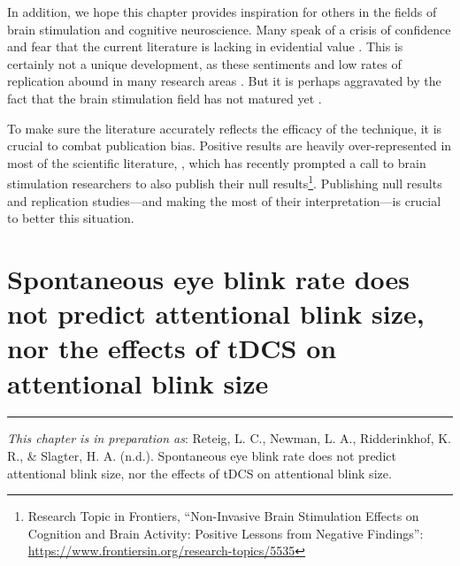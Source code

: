 \documentclass[11pt,]{memoir}
\let\rmarkdownfootnote\footnote%
\def\footnote{\protect\rmarkdownfootnote}
\begin{document}
In addition, we hope this chapter provides inspiration for others in the fields of brain stimulation and cognitive neuroscience. Many speak of a crisis of confidence \autocite{Heroux2017} and fear that the current literature is lacking in evidential value \autocite{Medina2017}. This is certainly not a unique development, as these sentiments \autocite{Baker2015} and low rates of replication abound in many research areas \autocites{OSC2015}{Camerer2018}{Klein2018}. But it is perhaps aggravated by the fact that the brain stimulation field has not matured yet \autocite{Parkin2015}.

To make sure the literature accurately reflects the efficacy of the technique, it is crucial to combat publication bias. Positive results are heavily over-represented in most of the scientific literature, \autocites{Ferguson2012}{Franco2014}{Fanelli2012}, which has recently prompted a call to brain stimulation researchers to also publish their null results\footnote{Research Topic in Frontiers, ``Non-Invasive Brain Stimulation Effects on Cognition and Brain Activity: Positive Lessons from Negative Findings'': \url{https://www.frontiersin.org/research-topics/5535}}. Publishing null results and replication studies---and making the most of their interpretation---is crucial to better this situation.

\hypertarget{AB-tDCS-sEBR}{%
\chapter{Spontaneous eye blink rate does not predict attentional blink size, nor the effects of tDCS on attentional blink size}\label{AB-tDCS-sEBR}}


\vspace*{\fill}

\begin{center}\rule{0.5\linewidth}{\linethickness}\end{center}

\small

\noindent
\emph{This chapter is in preparation as}: Reteig, L. C., Newman, L. A., Ridderinkhof, K. R., \& Slagter, H. A. (n.d.). Spontaneous eye blink rate does not predict attentional blink size, nor the effects of tDCS on attentional blink size.
\newpage
\normalsize
\end{document}
